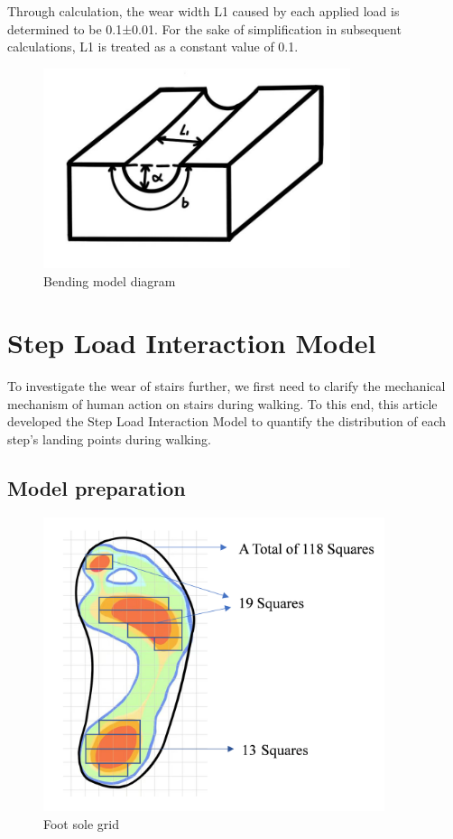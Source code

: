 \documentclass{mcmthesis}
\begin{document}
Through calculation, the wear width L1 caused by each applied load is determined to be 0.1±0.01. For the sake of simplification in subsequent calculations, L1 is treated as a constant value of 0.1.

\begin{figure}[h]  %
  \small
  \centering  %
  \includegraphics[width=9cm]{6-Bending model diagram.png}
  \caption{Bending model diagram} \label{fig:2}  %
  \end{figure}  %

  \section{Step Load Interaction Model}
  To investigate the wear of stairs further, we first need to clarify the mechanical mechanism of human action on stairs during walking. To this end, this article developed the Step Load Interaction Model to quantify the distribution of each step's landing points during walking.
  
  \subsection{Model preparation}
  
  \begin{figure}[h]  %
    \small
    \centering  %
    \includegraphics[width=10cm]{5-Foot sole grid.png}
    \caption{Foot sole grid} \label{fig:2}  %
    \end{figure}  %
  
\end{document}
